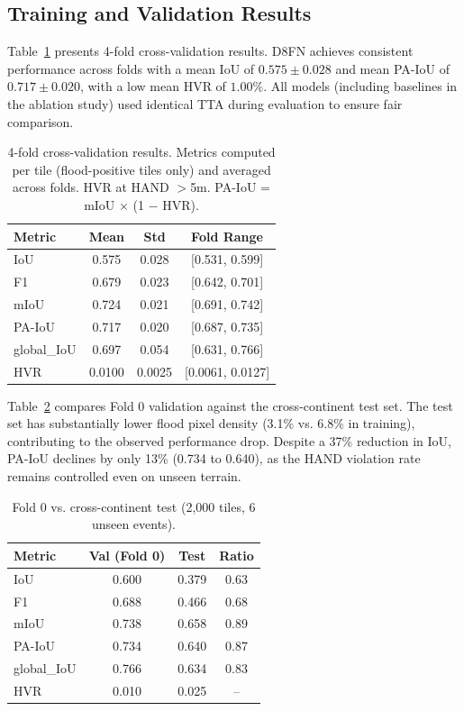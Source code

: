 \documentclass[journal]{IEEEtran}
\begin{document}
\subsection{Training and Validation Results}
\label{sec:results}

Table~\ref{tab:cv} presents 4-fold cross-validation results. D8FN achieves consistent performance across folds with a mean IoU of $0.575 \pm 0.028$ and mean PA-IoU of $0.717 \pm 0.020$, with a low mean HVR of $1.00\%$. All models (including baselines in the ablation study) used identical TTA during evaluation to ensure fair comparison.

\begin{table}[t]
\centering
\caption{4-fold cross-validation results. Metrics computed per tile (flood-positive tiles only) and averaged across folds. HVR at HAND $>$5m. PA-IoU = mIoU $\times$ (1 $-$ HVR).}
\label{tab:cv}
\small
\begin{tabular}{lccc}
\toprule
Metric & Mean & Std & Fold Range \\
\midrule
IoU & 0.575 & 0.028 & [0.531, 0.599] \\
F1 & 0.679 & 0.023 & [0.642, 0.701] \\
mIoU & 0.724 & 0.021 & [0.691, 0.742] \\
PA-IoU & 0.717 & 0.020 & [0.687, 0.735] \\
global\_IoU & 0.697 & 0.054 & [0.631, 0.766] \\
HVR & 0.0100 & 0.0025 & [0.0061, 0.0127] \\
\bottomrule
\end{tabular}
\end{table}

Table~\ref{tab:test} compares Fold 0 validation against the cross-continent test set. The test set has substantially lower flood pixel density (3.1\% vs. 6.8\% in training), contributing to the observed performance drop. Despite a 37\% reduction in IoU, PA-IoU declines by only 13\% (0.734 to 0.640), as the HAND violation rate remains controlled even on unseen terrain.

\begin{table}[t]
\centering
\caption{Fold 0 vs. cross-continent test (2,000 tiles, 6 unseen events).}
\label{tab:test}
\small
\begin{tabular}{lccc}
\toprule
Metric & Val (Fold 0) & Test & Ratio \\
\midrule
IoU & 0.600 & 0.379 & 0.63 \\
F1 & 0.688 & 0.466 & 0.68 \\
mIoU & 0.738 & 0.658 & 0.89 \\
PA-IoU & 0.734 & 0.640 & 0.87 \\
global\_IoU & 0.766 & 0.634 & 0.83 \\
HVR & 0.010 & 0.025 & -- \\
\bottomrule
\end{tabular}
\end{table}
\end{document}
